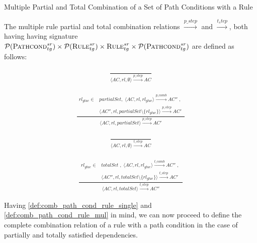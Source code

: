 \begin{definition}{Multiple Partial and Total Combination of a Set of Path Conditions with a Rule\\}
\label{def:comb_path_cond_rule_mul}



The multiple rule partial and total combination relations $\stackrel{p\_step}{\rightarrow}$ and $\stackrel{t_step}{\rightarrow}$, both having having signature $\mathcal{P}(\textsc{Pathcond}^{sr}_{tg}) \times \mathcal{P}(\textsc{Rule}^{sr}_{tg}) \times \textsc{Rule}^{sr}_{tg} \times \mathcal{P}(\textsc{Pathcond}^{sr}_{tg})$ are defined as follows:

\begin{align}
\label{eq:pstepbase}
\frac{\begin{array}{ll}
\end{array}}
{\langle AC,rl,\emptyset\rangle \xrightarrow{p\_step} AC}
\end{align}

\begin{align}
\label{eq:pstep}
\frac{\begin{array}{ll}
rl_{glue}\in &partialSet,\;\langle AC,rl,rl_{glue}\rangle \xrightarrow{p\_comb} AC''\;,\;\\
&\langle AC'',rl,partialSet\setminus\{rl_{glue}\}\rangle \xrightarrow{p\_step} AC'
\end{array}}
{\langle AC,rl,partialSet\rangle \xrightarrow{p\_step} AC'}
\end{align}

\begin{align}
\label{eq:tstepbase}
\frac{\begin{array}{ll}
\end{array}}
{\langle AC,rl,\emptyset\rangle \xrightarrow{t\_step} AC}
\end{align}

\begin{align}
\label{eq:tstep}
\frac{\begin{array}{ll}
rl_{glue}\in &totalSet\;,\;\langle AC,rl,rl_{glue}\rangle \xrightarrow{t\_comb} AC''\;,\;\\
&\langle AC'',rl,totalSet\setminus\{rl_{glue}\}\rangle \xrightarrow{t\_step} AC'
\end{array}}
{\langle AC,rl,totalSet\rangle \xrightarrow{t\_step} AC''} 
\end{align}
\end{definition}

Having \cref{def:comb_path_cond_rule_single} and \cref{def:comb_path_cond_rule_mul} in mind, we can now proceed to define the complete combination relation of a rule with a path condition in the case of partially and totally satisfied dependencies. 

